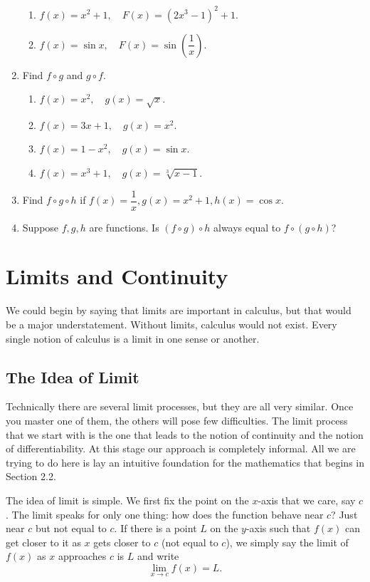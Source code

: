 \documentclass[11pt]{book}
\theoremstyle{break}
\theoremstyle{no_label}
\numberwithin{equation}{section}
\begin{document}
\begin{enumerate}[label=\arabic*.]
\begin{enumerate}
        \item $f(x)=x^2+1, \quad F(x)=(2x^3-1)^2+1$.
        \item $f(x)=\sin x, \quad F(x)=\sin\left(\dfrac{1}{x}\right)$.
    \end{enumerate}
    \item Find $f\circ g$ and $g\circ f$.
    \begin{enumerate}
        \item $f(x)=x^2, \quad g(x)=\sqrt{x}$.
        \item $f(x)=3x+1, \quad g(x)=x^2$.
        \item $f(x)=1-x^2, \quad g(x)=\sin x$.
        \item $f(x)=x^3+1, \quad g(x)=\sqrt[3]{x-1}$.
    \end{enumerate}
    \item Find $f\circ g\circ h$ if $f(x)=\dfrac{1}{x}, g(x)=x^2+1, h(x)=\cos x$.
    \item Suppose $f, g, h$ are functions. Is $(f\circ g)\circ h$ always equal to $f\circ(g\circ h)$?
\end{enumerate}

\setlength{\delimitershortfall}{13.5pt}

\chapter{Limits and Continuity}

We could begin by saying that limits are important in calculus, but that would be a major understatement. Without limits, calculus would not exist. Every single notion of calculus is a limit in one sense or another.

\section{The Idea of Limit}

Technically there are several limit processes, but they are all very similar. Once you master one of them, the others will pose few difficulties. The limit process that we start with is the one that leads to the notion of continuity and the notion of differentiability. At this stage our approach is completely informal. All we are trying to do here is lay an intuitive foundation for the mathematics that begins in Section 2.2.

The idea of limit is simple. We first fix the point on the $x$-axis that we care, say $c$. The limit speaks for only one thing: how does the function behave near $c$? Just near $c$ but not equal to $c$. If there is a point $L$ on the $y$-axis such that $f(x)$ can get closer to it as $x$ gets closer to $c$ (not equal to $c$), we simply say the limit of $f(x)$ as $x$ approaches $c$ is $L$ and write $$\lim_{x\to c}f(x)=L.$$
\end{document}
